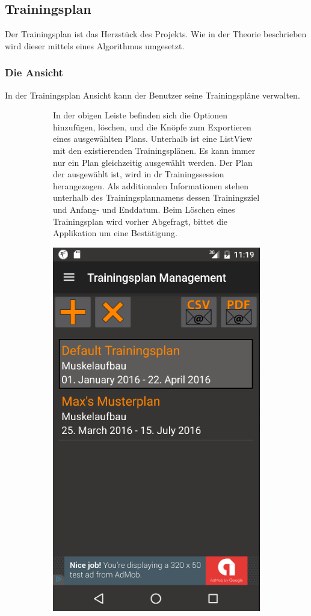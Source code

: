 \documentclass[FIPLY_base.tex]{subfiles}
\begin{document}
	\subsection{Trainingsplan}
		Der Trainingsplan ist das Herzstück des Projekts. Wie in der Theorie beschrieben wird dieser mittels eines Algorithmus umgesetzt. 
	\subsubsection{Die Ansicht}
		 In der Trainingsplan Ansicht kann der Benutzer seine Trainingspläne verwalten.
		 \begin{figure}[H]
			\begin{subfigure}[b]{0.4\textwidth}
				In der obigen Leiste befinden sich die Optionen \grqq{}hinzufügen\grqq{}, \grqq{}löschen\grqq{}, und die Knöpfe zum Exportieren eines ausgewählten Plans.\newline
				Unterhalb ist eine ListView mit den existierenden Trainingsplänen. Es kann immer nur ein Plan gleichzeitig ausgewählt werden. Der Plan der ausgewählt ist, wird in dr Trainingssession herangezogen. Als additionalen Informationen stehen unterhalb des Trainingsplannamens dessen Trainingsziel und Anfang- und Enddatum.
				Beim Löschen eines Trainingsplan wird vorher Abgefragt, bittet die Applikation um eine Bestätigung.
				\newline\newline\newline\newline
			\end{subfigure}
			\hfil
		 	\begin{subfigure}[b]{0.4\textwidth}
		 		\includegraphics[scale=0.50]{img/tplanmgmt}

\end{subfigure}
\end{figure}
\end{document}

